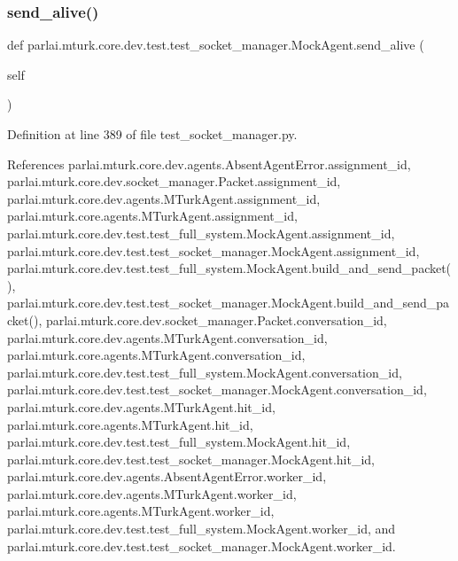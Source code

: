 \subsubsection{\texorpdfstring{send\+\_\+alive()}{send\_alive()}}
{\footnotesize\ttfamily def parlai.\+mturk.\+core.\+dev.\+test.\+test\+\_\+socket\+\_\+manager.\+Mock\+Agent.\+send\+\_\+alive (\begin{DoxyParamCaption}\item[{}]{self }\end{DoxyParamCaption})}



Definition at line 389 of file test\+\_\+socket\+\_\+manager.\+py.



References parlai.\+mturk.\+core.\+dev.\+agents.\+Absent\+Agent\+Error.\+assignment\+\_\+id, parlai.\+mturk.\+core.\+dev.\+socket\+\_\+manager.\+Packet.\+assignment\+\_\+id, parlai.\+mturk.\+core.\+dev.\+agents.\+M\+Turk\+Agent.\+assignment\+\_\+id, parlai.\+mturk.\+core.\+agents.\+M\+Turk\+Agent.\+assignment\+\_\+id, parlai.\+mturk.\+core.\+dev.\+test.\+test\+\_\+full\+\_\+system.\+Mock\+Agent.\+assignment\+\_\+id, parlai.\+mturk.\+core.\+dev.\+test.\+test\+\_\+socket\+\_\+manager.\+Mock\+Agent.\+assignment\+\_\+id, parlai.\+mturk.\+core.\+dev.\+test.\+test\+\_\+full\+\_\+system.\+Mock\+Agent.\+build\+\_\+and\+\_\+send\+\_\+packet(), parlai.\+mturk.\+core.\+dev.\+test.\+test\+\_\+socket\+\_\+manager.\+Mock\+Agent.\+build\+\_\+and\+\_\+send\+\_\+packet(), parlai.\+mturk.\+core.\+dev.\+socket\+\_\+manager.\+Packet.\+conversation\+\_\+id, parlai.\+mturk.\+core.\+dev.\+agents.\+M\+Turk\+Agent.\+conversation\+\_\+id, parlai.\+mturk.\+core.\+agents.\+M\+Turk\+Agent.\+conversation\+\_\+id, parlai.\+mturk.\+core.\+dev.\+test.\+test\+\_\+full\+\_\+system.\+Mock\+Agent.\+conversation\+\_\+id, parlai.\+mturk.\+core.\+dev.\+test.\+test\+\_\+socket\+\_\+manager.\+Mock\+Agent.\+conversation\+\_\+id, parlai.\+mturk.\+core.\+dev.\+agents.\+M\+Turk\+Agent.\+hit\+\_\+id, parlai.\+mturk.\+core.\+agents.\+M\+Turk\+Agent.\+hit\+\_\+id, parlai.\+mturk.\+core.\+dev.\+test.\+test\+\_\+full\+\_\+system.\+Mock\+Agent.\+hit\+\_\+id, parlai.\+mturk.\+core.\+dev.\+test.\+test\+\_\+socket\+\_\+manager.\+Mock\+Agent.\+hit\+\_\+id, parlai.\+mturk.\+core.\+dev.\+agents.\+Absent\+Agent\+Error.\+worker\+\_\+id, parlai.\+mturk.\+core.\+dev.\+agents.\+M\+Turk\+Agent.\+worker\+\_\+id, parlai.\+mturk.\+core.\+agents.\+M\+Turk\+Agent.\+worker\+\_\+id, parlai.\+mturk.\+core.\+dev.\+test.\+test\+\_\+full\+\_\+system.\+Mock\+Agent.\+worker\+\_\+id, and parlai.\+mturk.\+core.\+dev.\+test.\+test\+\_\+socket\+\_\+manager.\+Mock\+Agent.\+worker\+\_\+id.



